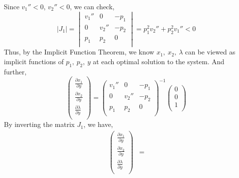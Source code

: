 \documentclass{article}
\begin{document}
\begin{enumerate}
    Since $v_1'' < 0$, $v_2'' < 0$, we can check,
        \begin{equation*}
            |J_1| = \begin{vmatrix}
                v_1'' &      0 & -p_1  \\
                0     &  v_2'' & -p_2  \\
                p_1   &  p_2   &    0  \\                
            \end{vmatrix}
            = p_1^2 v_2'' + p_2^2 v_1'' < 0
        \end{equation*}    
    Thus, by the Implicit Function Theorem, we know $x_1,\ x_2,\ \lambda$ can be viewed as implicit functions 
    of $p_1,\ p_2,\ y$ at each optimal solution to the system. And further, 
        \begin{equation*}
            \begin{pmatrix}
                \frac{\partial x_1}{\partial y} \\
                \frac{\partial x_2}{\partial y} \\
                \frac{\partial \lambda}{\partial y} \\
            \end{pmatrix} = 
            \begin{pmatrix}
                v_1'' &      0 & -p_1  \\
                0     &  v_2'' & -p_2  \\
                p_1   &  p_2   &    0  \\                
            \end{pmatrix}^{-1}
            \begin{pmatrix}
                0 \\
                0 \\
                1 \\
            \end{pmatrix}
        \end{equation*}
    By inverting the matrix $J_1$, we have, 
        \begin{align*}
            \begin{pmatrix}
                \frac{\partial x_1}{\partial y} \\
                \frac{\partial x_2}{\partial y} \\
                \frac{\partial \lambda}{\partial y} \\
            \end{pmatrix} &= 

\end{align*}
\end{enumerate}
\end{document}
